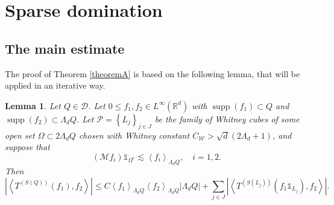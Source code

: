 \documentclass[12pt]{amsart}
\newcommand{\R}{\mathbb{R}}
\newcommand{\supp}[1]{\operatorname{supp}\left(#1\right) }
\newcommand{\one}{\mathds{1}}
\newcommand{\D}{\mathscr{D}}
\theoremstyle{plain}
\newtheorem{lemma}[theorem]{Lemma}
\theoremstyle{definition} %
\numberwithin{equation}{section}
\begin{document}
\section{Sparse domination} \label{sec:sec2}

\subsection{The main estimate} The proof of Theorem \ref{theoremA} is based on the following lemma, that will be applied in an iterative way.

\begin{lemma}\label{lemma1.1_Jose}
Let $Q\in \D$. Let $0\leq f_1,f_2\in L^\infty(\R^d)$ with $\supp{f_1}\subset Q$ and $\supp{f_2}\subset \Lambda_dQ$. Let $\mathcal{P}=\left\{L_j\right\}_{j\in J}$ be the family of Whitney cubes of some open set $\Omega\subset 2\Lambda_dQ$ chosen with Whitney constant $C_{\mathcal{W}}>\sqrt{d}(2\Lambda_d+1)$, and suppose that
    \[
    (\mathcal{M}f_i) \one_{\Omega^c} \lesssim \left\langle f_i\right\rangle_{\Lambda_dQ},\quad i=1,2.
    \]
Then
    \[
    \left|\left\langle T^{(S(Q))} (f_1), f_2\right\rangle\right|
    \leq
    C\left\langle f_1\right\rangle_{\Lambda_dQ}\left\langle f_2\right\rangle_{\Lambda_dQ}|\Lambda_dQ|
    +
    \sum_{j\in J}\left|\left\langle T^{(S(L_j))} (f_1 \one_{L_j}), f_2\right\rangle\right|.
    \]
\end{lemma}
\end{document}
